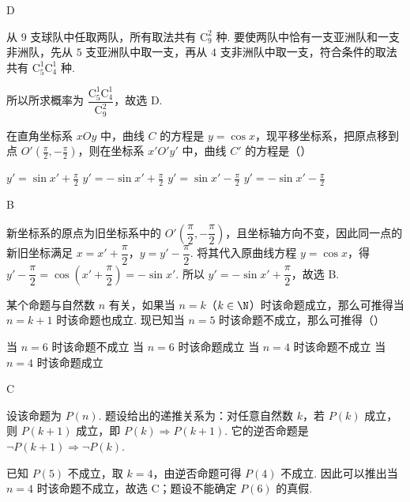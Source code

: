 \begin{answer}
D
\end{answer}

\begin{solution}
从 \(9\) 支球队中任取两队，所有取法共有 \(\mathrm C_9^2\) 种. 要使两队中恰有一支亚洲队和一支非洲队，先从 \(5\) 支亚洲队中取一支，再从 \(4\) 支非洲队中取一支，符合条件的取法共有 \(\mathrm C_5^1\mathrm C_4^1\) 种.

所以所求概率为 \(\dfrac{\mathrm C_5^1\mathrm C_4^1}{\mathrm C_9^2}\)，故选 D.
\end{solution}

\begin{problem}
在直角坐标系 \(xOy\) 中，曲线 \(C\) 的方程是 \(y = \cos x\)，现平移坐标系，把原点移到点 \(O'\left(\frac{\pi}{2}, -\frac{\pi}{2}\right)\)，则在坐标系 \(x'O'y'\) 中，曲线 \(C'\) 的方程是（\quad）

\choices
    {\(y' = \sin x' + \frac{\pi}{2}\)}
    {\(y' = -\sin x' + \frac{\pi}{2}\)}
    {\(y' = \sin x' - \frac{\pi}{2}\)}
    {\(y' = -\sin x' - \frac{\pi}{2}\)}
\end{problem}

\begin{answer}
B
\end{answer}

\begin{solution}
新坐标系的原点为旧坐标系中的 \(O'\left(\dfrac\pi2,-\dfrac\pi2\right)\)，且坐标轴方向不变，因此同一点的新旧坐标满足
\(x=x'+\dfrac\pi2\)，\(y=y'-\dfrac\pi2\). 将其代入原曲线方程 \(y=\cos x\)，得
\(y'-\dfrac\pi2=\cos\left(x'+\dfrac\pi2\right)=-\sin x'\). 所以
\(y'=-\sin x'+\dfrac\pi2\)，故选 B.
\end{solution}

\begin{problem}
某个命题与自然数 \(n\) 有关，如果当 \(n = k\)（\(k \in \N\)）时该命题成立，那么可推得当 \(n = k + 1\) 时该命题也成立. 现已知当 \(n = 5\) 时该命题不成立，那么可推得（\quad）

\choices
    {当 \(n = 6\) 时该命题不成立}
    {当 \(n = 6\) 时该命题成立}
    {当 \(n = 4\) 时该命题不成立}
    {当 \(n = 4\) 时该命题成立}
\end{problem}

\begin{answer}
C
\end{answer}

\begin{solution}
设该命题为 \(P(n)\). 题设给出的递推关系为：对任意自然数 \(k\)，若 \(P(k)\) 成立，则 \(P(k+1)\) 成立，即 \(P(k)\Rightarrow P(k+1)\). 它的逆否命题是 \(\neg P(k+1)\Rightarrow\neg P(k)\).

已知 \(P(5)\) 不成立，取 \(k=4\)，由逆否命题可得 \(P(4)\) 不成立. 因此可以推出当 \(n=4\) 时该命题不成立，故选 C；题设不能确定 \(P(6)\) 的真假.
\end{solution}

